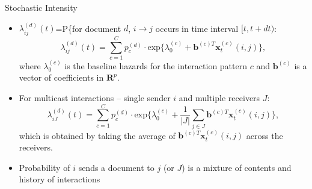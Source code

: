 \documentclass[10pt]{beamer}
\def\bni{\begin{itemize}} \def\ei{\end{itemize}}
\theoremstyle{definition}
\theoremstyle{remark}
\begin{document}
\begin{frame}{Stochastic Intensity}
	\bni
		\item $\lambda^{(d)}_{ij}(t)$=P\{for document $d$, $i\rightarrow j$ occurs in time interval $[t, t+dt)$:
		\footnotesize \begin{equation}
		\lambda^{(d)}_{ij}(t)=\sum\limits_{c=1}^{C} p^{(d)}_c
		\cdot  \mbox{exp}\Big\{\lambda^{(c)}_0 + \boldsymbol{b}^{(c)T}\boldsymbol{x}^{(c)}_t(i, j)\Big\},
		\end{equation}\normalsize
		where $\lambda^{(c)}_0$ is the baseline hazards for the interaction pattern $c$ and $\boldsymbol{b}^{(c)}$ is a vector of coefficients in $\boldsymbol{R}^{p}$.\vspace{0.4cm}
		\item  For multicast interactions -- single sender $i$ and multiple
		receivers $J$:
		\footnotesize 
		\begin{equation}
		\lambda^{(d)}_{iJ}(t)= \sum\limits_{c=1}^{C} p^{(d)}_c\cdot\mbox{exp}\Big\{\lambda^{(c)}_0+\frac{1}{|J|}\sum\limits_{j \in J} \boldsymbol{b}^{(c)T}\boldsymbol{x}^{(c)}_t(i, j)\Big\},
		\end{equation}\normalsize
		which is obtained by taking the average of $\boldsymbol{b}^{(c)T}\boldsymbol{x}^{(c)}_t(i, j)$ across the receivers.\vspace{0.4cm}
		\item Probability of $i$ sends a document to $j$ (or $J$) is a mixture of contents and history of interactions
		\ei
\end{frame}
\end{document}
